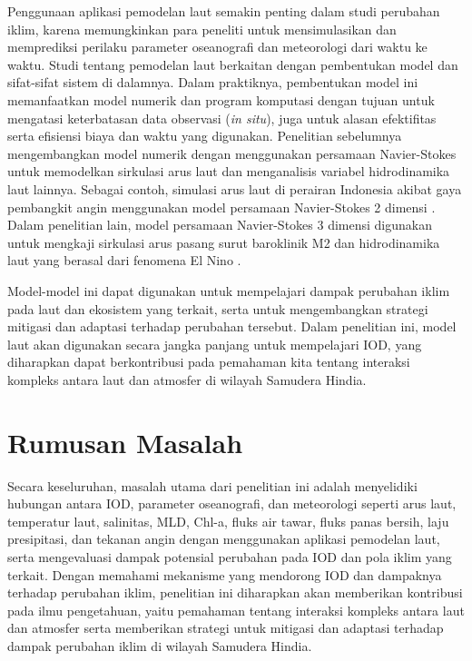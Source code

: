 \begin{spacing}{1.5}
	Penggunaan aplikasi pemodelan laut semakin penting dalam studi perubahan iklim, karena memungkinkan para peneliti untuk mensimulasikan dan memprediksi perilaku parameter oseanografi dan meteorologi dari waktu ke waktu. Studi tentang pemodelan laut berkaitan dengan pembentukan model dan sifat-sifat sistem di dalamnya. Dalam praktiknya, pembentukan model ini memanfaatkan model numerik dan program komputasi dengan tujuan untuk mengatasi keterbatasan data observasi (\textit{in situ}), juga untuk alasan efektifitas serta efisiensi biaya dan waktu yang digunakan. Penelitian sebelumnya mengembangkan model numerik dengan menggunakan persamaan Navier-Stokes untuk memodelkan sirkulasi arus laut dan menganalisis variabel hidrodinamika laut lainnya. Sebagai contoh, simulasi arus laut di perairan Indonesia akibat gaya pembangkit angin menggunakan model persamaan Navier-Stokes 2 dimensi \cite{Rizal2018,Ikhwan2019,Haditiar2019}. Dalam penelitian lain, model persamaan Navier-Stokes 3 dimensi digunakan untuk mengkaji sirkulasi arus pasang surut baroklinik M2 dan hidrodinamika laut yang berasal dari fenomena El Nino \cite{Rizal2010,Haditiar2020,Ikhwan2021}.
	
	Model-model ini dapat digunakan untuk mempelajari dampak perubahan iklim pada laut dan ekosistem yang terkait, serta untuk mengembangkan strategi mitigasi dan adaptasi terhadap perubahan tersebut. Dalam penelitian ini, model laut akan digunakan secara jangka panjang untuk mempelajari IOD, yang diharapkan dapat berkontribusi pada pemahaman kita tentang interaksi kompleks antara laut dan atmosfer di wilayah Samudera Hindia. 
	
	\section[Rumusan Masalah]{Rumusan Masalah}
	Secara keseluruhan, masalah utama dari penelitian ini adalah menyelidiki hubungan antara IOD, parameter oseanografi, dan meteorologi seperti arus laut, temperatur laut, salinitas, MLD, Chl-a, fluks air tawar, fluks panas bersih, laju presipitasi, dan tekanan angin dengan menggunakan aplikasi pemodelan laut, serta mengevaluasi dampak potensial perubahan pada IOD dan pola iklim yang terkait. Dengan memahami mekanisme yang mendorong IOD dan dampaknya terhadap perubahan iklim, penelitian ini diharapkan akan memberikan kontribusi pada ilmu pengetahuan, yaitu pemahaman tentang interaksi kompleks antara laut dan atmosfer serta memberikan strategi untuk mitigasi dan adaptasi terhadap dampak perubahan iklim di wilayah Samudera Hindia.


\end{spacing}
